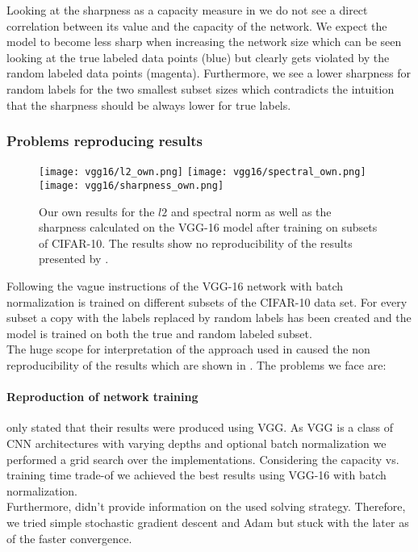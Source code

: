 %
Looking at the sharpness as a capacity measure in  we do not see a direct correlation between its value and the capacity of the network. We expect the model to become less sharp when increasing the network size which can be seen looking at the true labeled data points (blue) but clearly gets violated by the random labeled data points (magenta). Furthermore, we see a lower sharpness for random labels for the two smallest subset sizes which contradicts the intuition that the sharpness should be always lower for true labels. 
%
\subsubsection{Problems reproducing results}
\label{sec:problems-subset-sizes}
\begin{figure}
	\centering
	\texttt{[image: vgg16/l2\_own.png]}
	\texttt{[image: vgg16/spectral\_own.png]}
	\texttt{[image: vgg16/sharpness\_own.png]}
	\caption{Our own results for the $l2$ and spectral norm as well as the sharpness calculated on the VGG-16 model after training on subsets of CIFAR-10. The results show no reproducibility of the results presented by \cite{neyshabur2017exploring}.}	
	\label{fig:norms-own}
\end{figure}
Following the vague instructions of \cite{neyshabur2017exploring} the VGG-16 network with batch normalization  is trained on different subsets of the CIFAR-10  data set. For every subset a copy with the labels replaced by random labels has been created and the model is trained on both the true and random labeled subset. \\
%
The huge scope for interpretation of the approach used in \cite{neyshabur2017exploring} caused the non reproducibility of the results which are shown in . The problems we face are:
%
\paragraph{Reproduction of network training}
\label{sec:problems-reproduction-training}
\ns{} only stated that their results were produced using VGG. As VGG is a class of CNN architectures with varying depths and optional batch normalization we performed a grid search over the implementations. Considering the capacity vs. training time trade-of we achieved the best results using VGG-16 with batch normalization.\\
Furthermore, \cite{neyshabur2017exploring} didn't provide information on the used solving strategy. Therefore, we tried simple stochastic gradient descent and Adam but stuck with the later as of the faster convergence.
%
